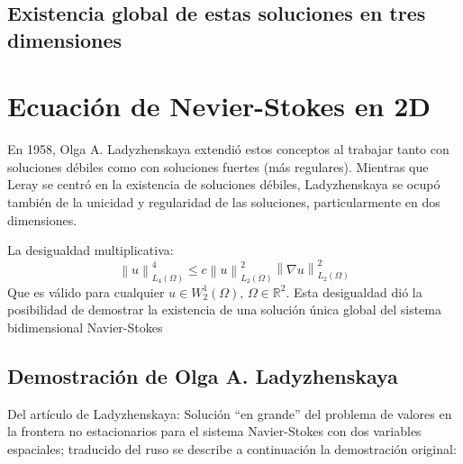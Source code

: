 \subsection{Existencia global de estas soluciones en tres dimensiones}



\section{Ecuación de Nevier-Stokes en 2D}
En 1958, Olga A. Ladyzhenskaya \cite{ladyzhenskaya1969mathematical} extendió estos conceptos al trabajar tanto con soluciones débiles como con soluciones fuertes (más regulares). Mientras que Leray se centró en la existencia de soluciones débiles, Ladyzhenskaya se ocupó también de la unicidad y regularidad de las soluciones, particularmente en dos dimensiones.

La desigualdad multiplicativa:
\begin{equation}
    \left\lVert u \right\rVert_{L_4(\Omega)}^4\leq c \left\lVert u\right\rVert_{L_2(\Omega)}^2\left\lVert \nabla u\right\rVert_{L_2(\Omega)}^2  
\end{equation}
Que es válido para cualquier $u\in W_2^1(\Omega),\, \Omega\in \mathbb{R}^2$. Esta desigualdad dió la posibilidad de demostrar la existencia de una solución única global del sistema bidimensional Navier-Stokes
\subsection{Demostración de Olga A. Ladyzhenskaya}
\label{sec321}
Del artículo de Ladyzhenskaya: Solución ``en grande'' del problema de valores en la frontera no estacionarios para el sistema Navier-Stokes con dos variables espaciales; traducido del ruso se describe a continuación la demostración original:

